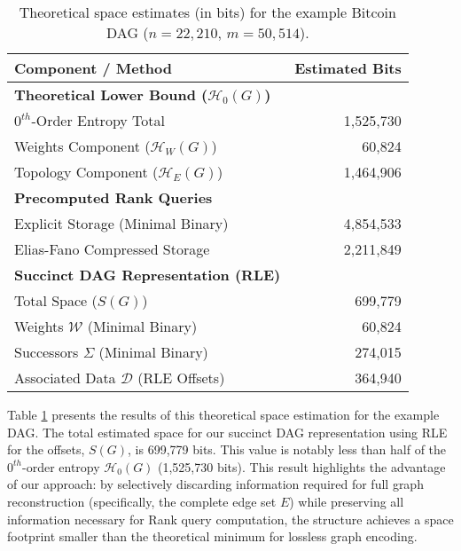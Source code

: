 \begin{table}[htbp]
    \centering
    \small
    \begin{tabular}{l r}
        \toprule
        Component / Method                                      & Estimated Bits \\
        \midrule
        \textbf{Theoretical Lower Bound ($\mathcal{H}_0(G)$)}   &                \\
        \quad $0^{th}$-Order Entropy Total                      & 1,525,730      \\
        \quad \quad Weights Component ($\mathcal{H}_W(G)$)      & 60,824         \\
        \quad \quad Topology Component ($\mathcal{H}_E(G)$)     & 1,464,906      \\
        \midrule
        \textbf{Precomputed Rank Queries}                       &                \\
        \quad Explicit Storage (Minimal Binary)                 & 4,854,533      \\
        \quad Elias-Fano Compressed Storage                     & 2,211,849      \\
        \midrule
        \textbf{Succinct DAG Representation (RLE)}              &                \\
        \quad Total Space ($S(G)$)                              & 699,779        \\
        \quad \quad Weights $\mathcal{W}$ (Minimal Binary)      & 60,824         \\
        \quad \quad Successors $\Sigma$ (Minimal Binary)        & 274,015        \\
        \quad \quad Associated Data $\mathcal{D}$ (RLE Offsets) & 364,940        \\
        \bottomrule
    \end{tabular}
    \label{tab:space_estimates_bitcoin}
    \caption{Theoretical space estimates (in bits) for the example Bitcoin DAG ($n=22,210$, $m=50,514$).}
\end{table}

Table \ref{tab:space_estimates_bitcoin} presents the results of this theoretical space estimation for the example DAG. The total estimated space for our succinct DAG representation using RLE for the offsets, $S(G)$, is 699,779 bits. This value is notably less than half of the $0^{th}$-order entropy $\mathcal{H}_0(G)$ (1,525,730 bits). This result highlights the advantage of our approach: by selectively discarding information required for full graph reconstruction (specifically, the complete edge set $E$) while preserving all information necessary for Rank query computation, the structure achieves a space footprint smaller than the theoretical minimum for lossless graph encoding.

